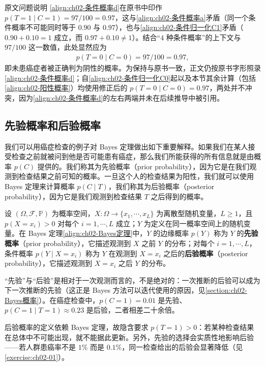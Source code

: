 \documentclass[../../main.tex]{subfiles}
\begin{document}
\begin{remark}原文问题说明
\eqref{align:ch02-条件概率d}在原书中印作 $p(T=1\mid C=1)=97/100=0.97$，这与\eqref{align:ch02-条件概率a}矛盾（同一个条件概率不可能同时等于 $0.90$ 与 $0.97$），也与\eqref{align:ch02-条件归一化C1}矛盾（$0.90+0.10=1$ 成立，而 $0.97+0.10\neq1$）。结合“$4$ 种条件概率”的上下文与 $97/100$ 这一数值，此处显然应为
\begin{align*}
  p(T=0\mid C=0) = 97/100 = 0.97 ,
\end{align*}
即未患癌症者被正确判为阴性的概率。为保持与原书一致，正文仍按原书字形照录\eqref{align:ch02-条件概率d}；自\eqref{align:ch02-条件归一化C0}起以及本节其余计算（包括\eqref{align:ch02-阳性概率}）均使用修正后的 $p(T=0\mid C=0)=0.97$，两处并不冲突，因为\eqref{align:ch02-条件概率d}的左右两端并未在后续推导中被引用。
\end{remark}

\subsection{先验概率和后验概率}\label{subsection:ch02-先验概率和后验概率}

我们可以用癌症检查的例子对 Bayes 定理做出如下重要解释。如果我们在某人接受检查之前就被问到他是否可能患有癌症，那么我们所能获得的所有信息就是由概率 $p(C)$ 提供的。我们称其为先验概率（prior probability），因为它是在我们观测到检查结果之前可知的概率。一旦这个人的检查结果为阳性，我们就可以使用 Bayes 定理来计算概率 $p(C\mid T)$，我们称其为后验概率（posterior probability），因为它是我们观测到检查结果 $T$ 之后得到的概率。

\begin{definition}[先验概率与后验概率]\label{definition:ch02-先验后验}
设 $(\Omega,\mathcal{F},\mathbb{P})$ 为概率空间，$X:\Omega\to\{x_1,\cdots,x_L\}$ 为离散型随机变量，$L\geqslant1$，且 $p(X=x_i)>0$ 对每个 $i=1,\cdots,L$ 成立；$Y$ 为定义在同一概率空间上的随机变量。在 Bayes 定理\eqref{align:ch02-Bayes定理}中，$Y$ 的边缘概率 $p(Y)$ 称为 $Y$ 的\textbf{先验概率}（prior probability），它描述观测到 $X$ 之前 $Y$ 的分布；对每个 $i=1,\cdots,L$，条件概率 $p(Y\mid X=x_i)$ 称为 $Y$ 在观测到 $X=x_i$ 之后的\textbf{后验概率}（posterior probability），它描述观测到 $X=x_i$ 之后 $Y$ 的分布。
\end{definition}

\begin{remark}
“先验”与“后验”是相对于一次观测而言的，不是绝对的：一次推断的后验可以成为下一次推断的先验（这正是 Bayes 方法可以迭代使用的原因，见\cref{section:ch02-Bayes概率}）。在癌症检查中，$p(C=1)=0.01$ 是先验、$p(C=1\mid T=1)\approx0.23$ 是后验，二者相差二十余倍。

后验概率的定义依赖 Bayes 定理，故隐含要求 $p(T=1)>0$：若某种检查结果在总体中不可能出现，就不能据此更新。另外，先验的选择会实质性地影响后验——若人群患癌率不是 $1\%$ 而是 $0.1\%$，同一检查给出的后验会显著降低（见\cref{exercise:ch02-01}）。
\end{remark}
\end{document}
